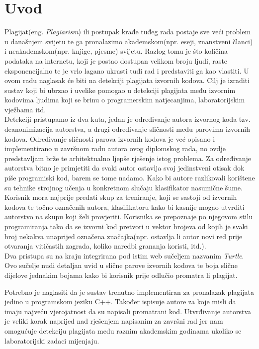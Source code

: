 \chapter*{Uvod}

	Plagijat(eng. \textit{Plagiarism}) ili postupak krađe tuđeg rada postaje sve veći problem u današnjem svijetu te ga pronalazimo akademskom(npr. eseji, znanstveni članci) i neakademskom(npr. knjige, pjesme) svijetu. Razlog tomu je što količina podataka na internetu, koji je postao dostupan velikom broju ljudi, raste eksponencijalno te je vrlo lagano ukrasti tuđi rad i predstaviti ga kao vlastiti. U ovom radu naglasak će biti na detekciji plagijata izvornih kodova. Cilj je izraditi sustav koji bi ubrzao i uvelike pomogao u detekciji plagijata među izvornim kodovima ljudima koji se brinu o programerskim natjecanjima, laboratorijskim vježbama itd. \\

	Detekciji pristupamo iz dva kuta, jedan je određivanje autora izvornog koda tzv. deanonimizacija autorstva, a drugi određivanje sličnosti među parovima izvornih kodova.   Određivanje sličnosti parova izvornih kodova je već opisano i implementirano u završnom radu autora ovog diplomskog rada, no ovdje predstavljam brže te arhitektualno ljepše rješenje istog problema. Za određivanje autorstva bitno je primjetiti da svaki autor ostavlja svoj jedinstveni otisak dok piše programiski kod, barem se tome nadamo. Kako bi autore razlikovali korištene su tehnike strojnog učenja u konkretnom slučaju klasifikator nasumične šume. Korisnik mora najprije predati skup za treniranje, koji se sastoji od izvornih kodova te točno označenih autora, klasifikatoru kako bi kasnije mogao utvrditi autorstvo na skupu koji želi provjeriti. Korisnika se prepoznaje po njegovom stilu programiranja tako da se izvorni kod pretvori u vektor brojeva od kojih je svaki broj nekakva unaprijed označena značajka(npr. ostavlja li autor novi red prije otvaranja vitičastih zagrada, koliko naredbi grananja koristi, itd.). \\

	Dva pristupa su na kraju integrirana pod istim web sučeljem nazvanim \textit{Turtle}. Ovo sučelje nudi detaljan uvid u slične parove izvornih kodova te boja slične dijelove jednakim bojama kako bi korisnik prije odlučio promatra li plagijat. 
\newpage
{}

\noindent Potrebno je naglasiti da je sustav trenutno implementiran za pronalazak plagijata jedino u programskom jeziku C++. Također ispisuje autore za koje misli da imaju najveću vjerojatnost da su napisali promatrani kod. Utvrđivanje autorstva je veliki korak naprijed nad rješenjem napisanim za završni rad jer nam omogućuje detekciju plagijata među raznim akademskim godinama ukoliko se laboratorijski zadaci mijenjaju.
